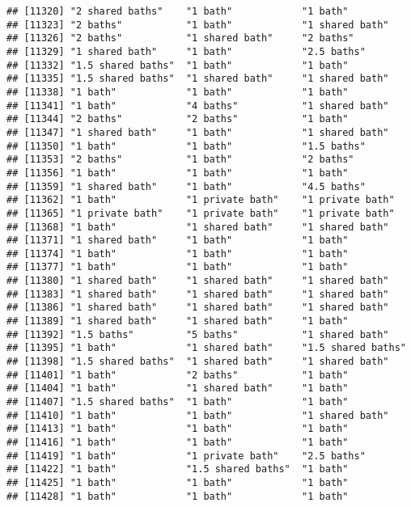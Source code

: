 \documentclass[
]{article}
\begin{document}
\begin{verbatim}
## [11320] "2 shared baths"    "1 bath"            "1 bath"           
## [11323] "2 baths"           "1 bath"            "1 shared bath"    
## [11326] "2 baths"           "1 shared bath"     "2 baths"          
## [11329] "1 shared bath"     "1 bath"            "2.5 baths"        
## [11332] "1.5 shared baths"  "1 bath"            "1 bath"           
## [11335] "1.5 shared baths"  "1 shared bath"     "1 shared bath"    
## [11338] "1 bath"            "1 bath"            "1 bath"           
## [11341] "1 bath"            "4 baths"           "1 shared bath"    
## [11344] "2 baths"           "2 baths"           "1 bath"           
## [11347] "1 shared bath"     "1 bath"            "1 shared bath"    
## [11350] "1 bath"            "1 bath"            "1.5 baths"        
## [11353] "2 baths"           "1 bath"            "2 baths"          
## [11356] "1 bath"            "1 bath"            "1 bath"           
## [11359] "1 shared bath"     "1 bath"            "4.5 baths"        
## [11362] "1 bath"            "1 private bath"    "1 private bath"   
## [11365] "1 private bath"    "1 private bath"    "1 private bath"   
## [11368] "1 bath"            "1 shared bath"     "1 shared bath"    
## [11371] "1 shared bath"     "1 bath"            "1 bath"           
## [11374] "1 bath"            "1 bath"            "1 bath"           
## [11377] "1 bath"            "1 bath"            "1 bath"           
## [11380] "1 shared bath"     "1 shared bath"     "1 shared bath"    
## [11383] "1 shared bath"     "1 shared bath"     "1 shared bath"    
## [11386] "1 shared bath"     "1 shared bath"     "1 shared bath"    
## [11389] "1 shared bath"     "1 shared bath"     "1 bath"           
## [11392] "1.5 baths"         "5 baths"           "1 shared bath"    
## [11395] "1 bath"            "1 shared bath"     "1.5 shared baths" 
## [11398] "1.5 shared baths"  "1 shared bath"     "1 shared bath"    
## [11401] "1 bath"            "2 baths"           "1 bath"           
## [11404] "1 bath"            "1 shared bath"     "1 bath"           
## [11407] "1.5 shared baths"  "1 bath"            "1 bath"           
## [11410] "1 bath"            "1 bath"            "1 shared bath"    
## [11413] "1 bath"            "1 bath"            "1 bath"           
## [11416] "1 bath"            "1 bath"            "1 bath"           
## [11419] "1 bath"            "1 private bath"    "2.5 baths"        
## [11422] "1 bath"            "1.5 shared baths"  "1 bath"           
## [11425] "1 bath"            "1 bath"            "1 bath"           
## [11428] "1 bath"            "1 bath"            "1 bath"           

\end{verbatim}
\end{document}
